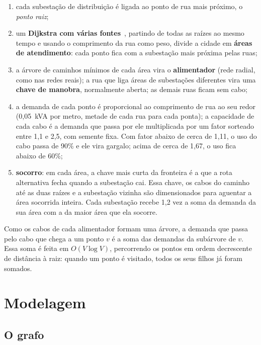 \documentclass[12pt]{article}
\begin{document}
\begin{enumerate}
  \item cada subestação de distribuição é ligada ao ponto de rua mais próximo, o \emph{ponto raiz};
  \item um \textbf{Dijkstra com várias fontes}~\cite{dijkstra1959}, partindo de todas as raízes ao mesmo tempo e usando o comprimento da rua como peso, divide a cidade em \textbf{áreas de atendimento}: cada ponto fica com a subestação mais próxima pelas ruas;
  \item a árvore de caminhos mínimos de cada área vira o \textbf{alimentador} (rede radial, como nas redes reais); a rua que liga áreas de subestações diferentes vira uma \textbf{chave de manobra}, normalmente aberta; as demais ruas ficam sem cabo;
  \item a demanda de cada ponto é proporcional ao comprimento de rua ao seu redor (0,05~kVA por metro, metade de cada rua para cada ponta); a capacidade de cada cabo é a demanda que passa por ele multiplicada por um fator sorteado entre 1,1 e 2,5, com semente fixa. Com fator abaixo de cerca de 1,11, o uso do cabo passa de 90\% e ele vira gargalo; acima de cerca de 1,67, o uso fica abaixo de 60\%;
  \item \textbf{socorro}: em cada área, a chave mais curta da fronteira é a que a rota alternativa fecha quando a subestação cai. Essa chave, os cabos do caminho até as duas raízes e a subestação vizinha são dimensionados para aguentar a área socorrida inteira. Cada subestação recebe 1,2 vez a soma da demanda da sua área com a da maior área que ela socorre.
\end{enumerate}

Como os cabos de cada alimentador formam uma árvore, a demanda que passa pelo cabo que chega a um ponto $v$ é a soma das demandas da subárvore de $v$. Essa soma é feita em $O(V \log V)$, percorrendo os pontos em ordem decrescente de distância à raiz: quando um ponto é visitado, todos os seus filhos já foram somados.

\section{Modelagem}
\label{sec:modelagem}

\subsection{O grafo}
\end{document}
